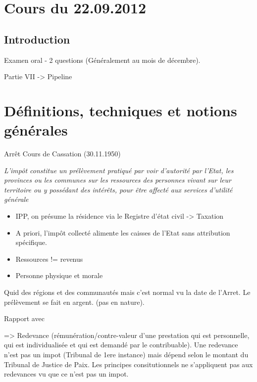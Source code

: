 \documentclass{book}
\begin{document}
\thispagestyle{empty}
\setcounter{page}{0}
\null
\newpage
{} \setcounter{page}{1} 




\tableofcontents



\chapter{Cours du 22.09.2012}
 \setcounter{page}{1} 

\section{Introduction}

Examen oral - 2 questions (Généralement au mois de décembre).

Partie VII -> Pipeline

\chapter{Définitions, techniques et notions générales}


Arrêt Cours de Cassation (30.11.1950)

\textit{L'impôt constitue un prélèvement pratiqué par voir d'autorité par l'Etat, les provinces ou les communes sur les ressources des personnes vivant sur leur territoire ou y possédant des intérêts, pour être affecté aux services d'utilité générale}\\

\begin{itemize}
\item IPP, on présume la résidence via le Registre d'état civil -> Taxation
\item A priori, l'impôt collecté alimente les caisses de l'Etat sans attribution spécifique.
\item Ressources != revenus
\item Personne physique et morale
\end{itemize}

Quid des régions et des communautés mais c'est normal vu la date de l'Arret. Le prélèvement se fait en argent. (pas en nature).

Rapport avec

=> Redevance (rémunération/contre-valeur d'une prestation qui est personnelle, qui est individualisée et qui est demandé par le contribuable). Une redevance n'est pas un impot (Tribunal de 1ere instance) mais dépend selon le montant du Tribunal de Justice de Paix. Les principes consitutionnels ne s'appliquent pas aux redevances vu que ce n'est pas un impot.
\end{document}
